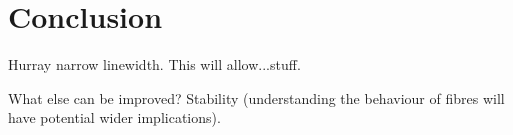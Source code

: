 \section{Conclusion}

Hurray narrow linewidth.
This will allow...stuff.

What else can be improved? Stability (understanding the behaviour of fibres will have potential wider implications).
